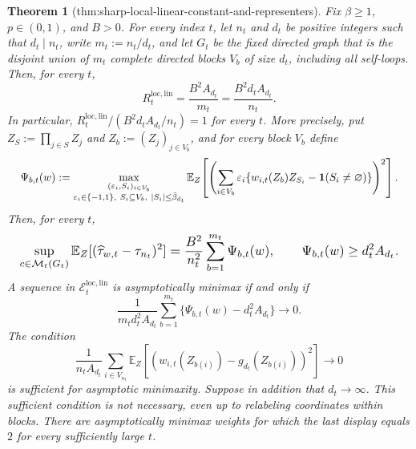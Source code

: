 \documentclass{article}
\newtheorem{theorem}{Theorem}
\begin{document}
\begin{theorem}[thm:sharp-local-linear-constant-and-representers]\label{thm:sharp-local-linear-constant-and-representers}
Fix \(\beta\ge1\), \(p\in(0,1)\), and \(B>0\). For every index \(t\), let \(n_t\) and \(d_t\) be positive integers such that \(d_t\mid n_t\), write \(m_t:=n_t/d_t\), and let \(G_t\) be the fixed directed graph that is the disjoint union of \(m_t\) complete directed blocks \(V_b\) of size \(d_t\), including all self-loops. Then, for every \(t\),
\[
R_t^{\mathrm{loc,lin}}=\frac{B^2A_{d_t}}{m_t}=\frac{B^2d_tA_{d_t}}{n_t}.
\]
In particular, \(R_t^{\mathrm{loc,lin}}/(B^2d_tA_{d_t}/n_t)=1\) for every \(t\). More precisely, put \(Z_S:=\prod_{j\in S}Z_j\) and \(Z_b:=(Z_j)_{j\in V_b}\), and for every block \(V_b\) define
\[
\makebox[\linewidth][c]{\resizebox{0.98\linewidth}{!}{\(\displaystyle \Psi_{b,t}(w):=\max_{\substack{(\varepsilon_i,S_i)_{i\in V_b}\\\varepsilon_i\in\{-1,1\},\ S_i\subseteq V_b,\ |S_i|\le\bar\beta_{d_t}}}
\mathbb E_Z\!\left[\left(\sum_{i\in V_b}\varepsilon_i\{w_{i,t}(Z_b)Z_{S_i}-\mathbf1(S_i\ne\varnothing)\}\right)^2\right].\)}}
\]
Then, for every \(t\),
\[
\makebox[\linewidth][c]{\resizebox{0.98\linewidth}{!}{\(\displaystyle \sup_{c\in\mathcal M_t(G_t)}\mathbb E_Z[(\widehat\tau_{w,t}-\tau_{n_t})^2]
=\frac{B^2}{n_t^2}\sum_{b=1}^{m_t}\Psi_{b,t}(w),
\qquad
\Psi_{b,t}(w)\ge d_t^2A_{d_t}.\)}}
\]
A sequence in \(\mathcal E_t^{\mathrm{loc,lin}}\) is asymptotically minimax if and only if
\[
\frac{1}{m_td_t^2A_{d_t}}\sum_{b=1}^{m_t}\{\Psi_{b,t}(w)-d_t^2A_{d_t}\}\longrightarrow0.
\]
The condition
\[
\frac{1}{n_tA_{d_t}}\sum_{i\in V_{n_t}}\mathbb E_Z[(w_{i,t}(Z_{b(i)})-g_{d_t}(Z_{b(i)}))^2]\longrightarrow0
\]
is sufficient for asymptotic minimaxity. Suppose in addition that \(d_t\to\infty\). This sufficient condition is not necessary, even up to relabeling coordinates within blocks. There are asymptotically minimax weights for which the last display equals \(2\) for every sufficiently large \(t\).
\end{theorem}
\end{document}
